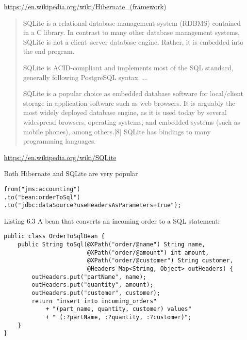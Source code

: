 \documentclass[Screen16to9,17pt]{foils}
\begin{document}
\url{https://en.wikipedia.org/wiki/Hibernate_(framework)}


\begin{quote}
  SQLite is a relational database management system (RDBMS) contained in a C library. In contrast to many other database management systems, SQLite is not a client–server database engine. Rather, it is embedded into the end program.

SQLite is ACID-compliant and implements most of the SQL standard, generally following PostgreSQL syntax. ...

SQLite is a popular choice as embedded database software for local/client storage in application software such as web browsers. It is arguably the most widely deployed database engine, as it is used today by several widespread browsers, operating systems, and embedded systems (such as mobile phones), among others.[8] SQLite has bindings to many programming languages.
\end{quote}

\url{https://en.wikipedia.org/wiki/SQLite}

Both Hibernate and SQLite are very popular




\begin{verbatim}
from("jms:accounting")
.to("bean:orderToSql")
.to("jdbc:dataSource?useHeadersAsParameters=true");
\end{verbatim}


Listing 6.3   A bean that converts an incoming order to a SQL statement:
\begin{verbatim}
public class OrderToSqlBean {
    public String toSql(@XPath("order/@name") String name,
                        @XPath("order/@amount") int amount,
                        @XPath("order/@customer") String customer,
                        @Headers Map<String, Object> outHeaders) {
        outHeaders.put("partName", name);
        outHeaders.put("quantity", amount);
        outHeaders.put("customer", customer);
        return "insert into incoming_orders"
            + "(part_name, quantity, customer) values"
            + " (:?partName, :?quantity, :?customer)";
    }
}
\end{verbatim}
\end{document}

